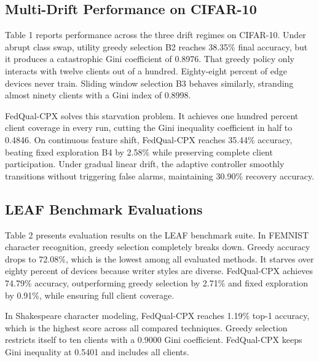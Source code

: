 \documentclass[conference]{IEEEtran}
\begin{document}
\subsection{Multi-Drift Performance on CIFAR-10}
Table 1 reports performance across the three drift regimes on CIFAR-10. Under abrupt class swap, utility greedy selection B2 reaches 38.35\% final accuracy, but it produces a catastrophic Gini coefficient of 0.8976. That greedy policy only interacts with twelve clients out of a hundred. Eighty-eight percent of edge devices never train. Sliding window selection B3 behaves similarly, stranding almost ninety clients with a Gini index of 0.8998.

FedQual-CPX solves this starvation problem. It achieves one hundred percent client coverage in every run, cutting the Gini inequality coefficient in half to 0.4846. On continuous feature shift, FedQual-CPX reaches 35.44\% accuracy, beating fixed exploration B4 by 2.58\% while preserving complete client participation. Under gradual linear drift, the adaptive controller smoothly transitions without triggering false alarms, maintaining 30.90\% recovery accuracy.

\subsection{LEAF Benchmark Evaluations}
Table 2 presents evaluation results on the LEAF benchmark suite. In FEMNIST character recognition, greedy selection completely breaks down. Greedy accuracy drops to 72.08\%, which is the lowest among all evaluated methods. It starves over eighty percent of devices because writer styles are diverse. FedQual-CPX achieves 74.79\% accuracy, outperforming greedy selection by 2.71\% and fixed exploration by 0.91\%, while ensuring full client coverage.

In Shakespeare character modeling, FedQual-CPX reaches 1.19\% top-1 accuracy, which is the highest score across all compared techniques. Greedy selection restricts itself to ten clients with a 0.9000 Gini coefficient. FedQual-CPX keeps Gini inequality at 0.5401 and includes all clients.
\end{document}
